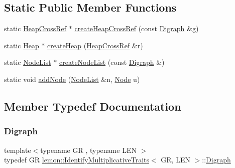 \subsection*{Static Public Member Functions}
\begin{DoxyCompactItemize}
\item 
static \hyperlink{structlemon_1_1_identify_multiplicative_traits_ae84c68f24215f7f666f26ca3125a284d}{Heap\+Cross\+Ref} $\ast$ \hyperlink{structlemon_1_1_identify_multiplicative_traits_aeee352c508bf38e1994c9f22052c0be8}{create\+Heap\+Cross\+Ref} (const \hyperlink{structlemon_1_1_identify_multiplicative_traits_a586c2b69092471f155318915c7e5bdd0}{Digraph} \&g)
\item 
static \hyperlink{structlemon_1_1_identify_multiplicative_traits_aa42c8b081b4e4783190eabd4ac03154f}{Heap} $\ast$ \hyperlink{structlemon_1_1_identify_multiplicative_traits_af8070d2658718ee55c51790c25196235}{create\+Heap} (\hyperlink{structlemon_1_1_identify_multiplicative_traits_ae84c68f24215f7f666f26ca3125a284d}{Heap\+Cross\+Ref} \&r)
\item 
static \hyperlink{structlemon_1_1_identify_multiplicative_traits_a686335471dfcb3c0b7baef1764679a66}{Node\+List} $\ast$ \hyperlink{structlemon_1_1_identify_multiplicative_traits_a4a44286cb2877fb94d45d8ed0752c407}{create\+Node\+List} (const \hyperlink{structlemon_1_1_identify_multiplicative_traits_a586c2b69092471f155318915c7e5bdd0}{Digraph} \&)
\item 
static void \hyperlink{structlemon_1_1_identify_multiplicative_traits_afb385c6c785e4fd909345d8c37fe57a7}{add\+Node} (\hyperlink{structlemon_1_1_identify_multiplicative_traits_a686335471dfcb3c0b7baef1764679a66}{Node\+List} \&n, \hyperlink{structlemon_1_1_identify_multiplicative_traits_a391c4d6be09a511224b23628fbc9c223}{Node} u)
\end{DoxyCompactItemize}


\subsection{Member Typedef Documentation}
\mbox{\label{structlemon_1_1_identify_multiplicative_traits_a586c2b69092471f155318915c7e5bdd0}} 
\subsubsection{\texorpdfstring{Digraph}{Digraph}}
{\footnotesize\ttfamily template$<$typename GR , typename L\+EN $>$ \\
typedef GR \hyperlink{structlemon_1_1_identify_multiplicative_traits}{lemon\+::\+Identify\+Multiplicative\+Traits}$<$ GR, L\+EN $>$\+::\hyperlink{structlemon_1_1_identify_multiplicative_traits_a586c2b69092471f155318915c7e5bdd0}{Digraph}}

